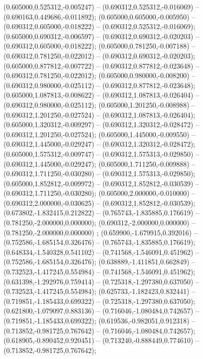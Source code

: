  (0.605000,0.525312,-0.005247) -- (0.690312,0.525312,-0.016069) -- (0.690163,0.449686,-0.011892);
 (0.605000,0.605000,-0.005950) -- (0.690312,0.605000,-0.018222) -- (0.690312,0.525312,-0.016069);
 (0.605000,0.690312,-0.006597) -- (0.690312,0.690312,-0.020203) -- (0.690312,0.605000,-0.018222);
 (0.605000,0.781250,-0.007188) -- (0.690312,0.781250,-0.022012) -- (0.690312,0.690312,-0.020203);
 (0.605000,0.877812,-0.007722) -- (0.690312,0.877812,-0.023648) -- (0.690312,0.781250,-0.022012);
 (0.605000,0.980000,-0.008200) -- (0.690312,0.980000,-0.025112) -- (0.690312,0.877812,-0.023648);
 (0.605000,1.087813,-0.008622) -- (0.690312,1.087813,-0.026404) -- (0.690312,0.980000,-0.025112);
 (0.605000,1.201250,-0.008988) -- (0.690312,1.201250,-0.027524) -- (0.690312,1.087813,-0.026404);
 (0.605000,1.320312,-0.009297) -- (0.690312,1.320312,-0.028472) -- (0.690312,1.201250,-0.027524);
 (0.605000,1.445000,-0.009550) -- (0.690312,1.445000,-0.029247) -- (0.690312,1.320312,-0.028472);
 (0.605000,1.575312,-0.009747) -- (0.690312,1.575313,-0.029850) -- (0.690312,1.445000,-0.029247);
 (0.605000,1.711250,-0.009888) -- (0.690312,1.711250,-0.030280) -- (0.690312,1.575313,-0.029850);
 (0.605000,1.852812,-0.009972) -- (0.690312,1.852812,-0.030539) -- (0.690312,1.711250,-0.030280);
 (0.605000,2.000000,-0.010000) -- (0.690312,2.000000,-0.030625) -- (0.690312,1.852812,-0.030539);
 (0.673802,-1.832415,0.212822) -- (0.765743,-1.835885,0.176619) -- (0.781250,-2.000000,0.000000);
 (0.690312,-2.000000,0.000000) -- (0.781250,-2.000000,0.000000) ;
 (0.659900,-1.679915,0.392016) -- (0.752586,-1.685154,0.326476) -- (0.765743,-1.835885,0.176619);
 (0.648334,-1.540328,0.541102) -- (0.741568,-1.546091,0.451962) -- (0.752586,-1.685154,0.326476);
 (0.638889,-1.411851,0.662849) -- (0.732523,-1.417245,0.554984) -- (0.741568,-1.546091,0.451962);
 (0.631398,-1.292976,0.759414) -- (0.725318,-1.297380,0.637050) -- (0.732523,-1.417245,0.554984);
 (0.625733,-1.182423,0.832441) -- (0.719851,-1.185433,0.699322) -- (0.725318,-1.297380,0.637050);
 (0.621800,-1.079097,0.883136) -- (0.716046,-1.080484,0.742657) -- (0.719851,-1.185433,0.699322);
 (0.619536,-0.982051,0.912318) -- (0.713852,-0.981725,0.767642) -- (0.716046,-1.080484,0.742657);
 (0.618905,-0.890452,0.920451) -- (0.713240,-0.888449,0.774610) -- (0.713852,-0.981725,0.767642);
